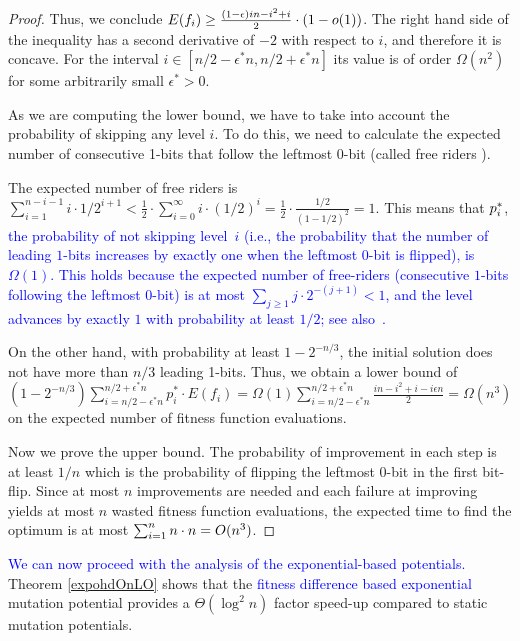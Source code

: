 \documentclass[lettersize,journal]{IEEEtran}
\newcommand{\rev}[1]{\textcolor{blue}{#1}}
\begin{document}
\begin{proof}
Thus, we conclude $E(f_i) \geq \frac{(1-\epsilon)in-i^2+i}{2}\cdot {\color{black}(1-o(1))}$. The right hand side of the inequality has a second derivative of $-2$ with respect to $i$, and therefore it is concave. For the interval $i\in [n/2-\epsilon^*n, n/2+\epsilon^*n]$ its value is of order $\Omega(n^2)$ for some   arbitrarily small $\epsilon^*>0$.


As we are computing the lower bound, we have to take into account the probability of skipping any level $i$. To do this, we need to calculate the expected number of consecutive 1-bits that follow the leftmost 0-bit (called free riders \cite{DrosteJansenWegener2002}). 

The expected number of free riders is $\sum_{i=1}^{n-i-1} i \cdot 1/2^{i+1} < \frac{1}{2} \cdot \sum_{i=0}^{\infty} i \cdot (1/2)^i= \frac{1}{2} \cdot \frac{1/2}{(1-1/2)^2}=1$. This means that ${\color{black}p^{*}_{i}}$, \textcolor{blue}{the probability of not skipping level~$i$ (i.e., the probability that the number of leading $1$-bits increases by exactly one when the leftmost $0$-bit is flipped), is $\Omega(1)$. This holds because the expected number of free-riders (consecutive $1$-bits following the leftmost $0$-bit) is at most $\sum_{j\ge1}j\cdot 2^{-(j+1)}<1$, and the level advances by exactly $1$ with probability at least $1/2$; see also~\cite{DrosteJansenWegener2002}.}

On the other hand, with probability at least $1- 2^{-n/3}$, the initial solution does not have more than $n/3$ leading 1-bits. Thus, we obtain a lower 
bound of  $(1-2^{-n/3}) \sum_{i=n/2-\epsilon^*n}^{n/2+\epsilon^*n} p^{*}_{i}\cdot E(f_i)=\Omega(1) \sum_{i=n/2-\epsilon^*n}^{n/2+\epsilon^*n} \frac{in-i^2+i-i\epsilon n}{2}=\Omega(n^3)$ on the expected number of fitness function evaluations.

Now we prove the upper bound. The probability of improvement in each step is at least $1/n$ which is the probability of flipping the leftmost 0-bit {\color{black} in the first} bit-flip. Since at most $n$ improvements are needed and each failure at improving yields {\color{black} at most $n$} wasted fitness function evaluations, the expected time to find the optimum is at most $\sum_{i=1}^n n \cdot {\color{black}n}= O(n^3)$.

\end{proof}


\rev{We can now proceed with the analysis of the exponential-based potentials.}
Theorem \ref{expohdOnLO} shows that the \rev{fitness difference based exponential}
     mutation potential provides a $\Theta(\log^2 n)$ factor
     speed-up compared to static mutation potentials. 
\end{document}
